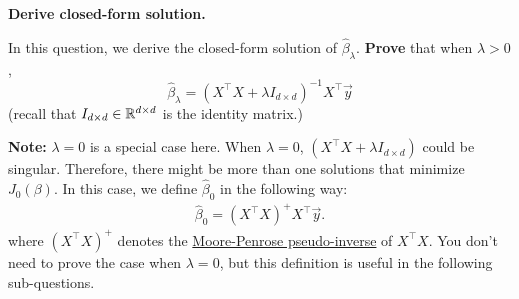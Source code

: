\item {}
\textbf{Derive closed-form solution.}

In this question, we derive the closed-form solution of $\hat{\beta}_\lambda.$ \textbf{Prove} that when $\lambda>0$, 
\begin{equation}
	\hat{\beta}_\lambda=(X^\top X+\lambda I_{d\times d})^{-1}X^\top \vec{y} \label{equ:sol}
\end{equation} (recall that $I_{d\times d}\in \mathbb{R}^{d\times d}$ is the identity matrix.)

\textbf{Note:} $\lambda=0$ is a special case here. When $\lambda=0$, $(X^\top X+\lambda I_{d\times d})$ could be singular. Therefore, there might be more than one solutions that minimize $J_0(\beta)$. In this case, we define $\hat{\beta}_0$ in the following way:
\begin{align}
	\hat{\beta}_0=(X^\top X)^{+}X^\top \vec{y}.
\end{align}
where $(X^\top X)^{+}$ denotes the \href{https://en.wikipedia.org/wiki/Moore-Penrose_inverse}{Moore-Penrose pseudo-inverse} of $X^\top X$. You don't need to prove the case when $\lambda=0$, but this definition is useful in the following sub-questions. 